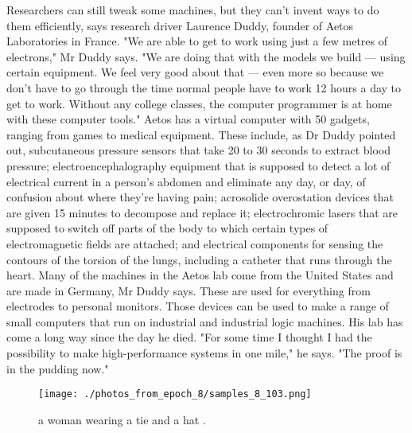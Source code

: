 \documentclass{article}%
\begin{document}
Researchers can still tweak some machines, but they can't invent ways to do them efficiently, says research driver Laurence Duddy, founder of Aetos Laboratories in France.\newline%
"We are able to get to work using just a few metres of electrons," Mr Duddy says. "We are doing that with the models we build — using certain equipment. We feel very good about that — even more so because we don't have to go through the time normal people have to work 12 hours a day to get to work. Without any college classes, the computer programmer is at home with these computer tools."\newline%
Aetos has a virtual computer with 50 gadgets, ranging from games to medical equipment. These include, as Dr Duddy pointed out, subcutaneous pressure sensors that take 20 to 30 seconds to extract blood pressure; electroencephalography equipment that is supposed to detect a lot of electrical current in a person's abdomen and eliminate any day, or day, of confusion about where they're having pain; acrosolide overostation devices that are given 15 minutes to decompose and replace it; electrochromic lasers that are supposed to switch off parts of the body to which certain types of electromagnetic fields are attached; and electrical components for sensing the contours of the torsion of the lungs, including a catheter that runs through the heart.\newline%
Many of the machines in the Aetos lab come from the United States and are made in Germany, Mr Duddy says. These are used for everything from electrodes to personal monitors. Those devices can be used to make a range of small computers that run on industrial and industrial logic machines.\newline%
His lab has come a long way since the day he died.\newline%
"For some time I thought I had the possibility to make high{-}performance systems in one mile," he says. "The proof is in the pudding now."\newline%

%


\begin{figure}[h!]%
\centering%
\texttt{[image: ./photos\_from\_epoch\_8/samples\_8\_103.png]}%
\caption{a woman wearing a tie and a hat .}%
\end{figure}

%
\end{document}
